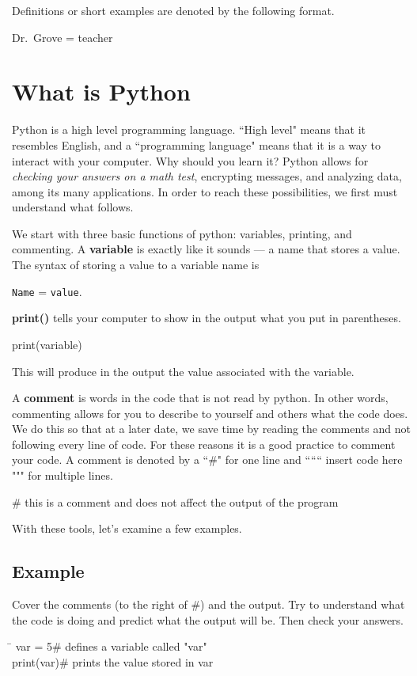\documentclass{article}
\newcommand{\define}[1]{\begin{center}\ttfamily #1\end{center}}
\begin{document}
\noindent Definitions or short examples are denoted by the following format.
\begin{center}
	\ttfamily Dr.~Grove = teacher
\end{center}
\section{What is Python}
Python is a high level programming language. ``High level" means that it resembles English, and a ``programming language" means that it is a way to interact with your computer. Why should you learn it? Python allows for \textit{checking your answers on a math test}, encrypting messages, and analyzing data, among its many applications. In order to reach these possibilities, we first must understand what follows.

We start with three basic functions of python: variables, printing, and commenting.
A \textbf{variable} is exactly like it sounds --- a name that stores a value. The syntax of storing a value to a variable name is 
\begin{center}
	\texttt{Name} = \texttt{value}.
\end{center}
\textbf{print()} tells your computer to show in the output what you put in parentheses.
\begin{center}
	\ttfamily print(variable)
\end{center}
This will produce in the output the value associated with the variable.

A \textbf{comment} is words in the code that is not read by python. In other words, commenting allows for you to describe to yourself and others what the code does. We do this so that at a later date, we save time by reading the comments and not following every line of code. For these reasons it is a good practice to comment your code. A comment is denoted by a ``\#" for one line and `````` insert code here """ for multiple lines.
\define{\# this is a comment and does not affect the output of the program}
\noindent With these tools, let's examine a few examples. 

\subsection{Example}
Cover the comments (to the right of \#) and the output. Try to understand what the code is doing and predict what the output will be. Then check your answers.
\vspace{1 mm}
\begin{tcolorbox}
	\ttfamily
	\begin{tabbing}
		\hspace{3.25 in}\=\hspace{3.25 in} \kill
		var = 5\>\# defines a variable called "var"\\
		print(var)\>\# prints the value stored in var
	\end{tabbing}
\end{tcolorbox}
\begin{tcolorbox}[colback=output]
\end{tcolorbox}
\end{document}
